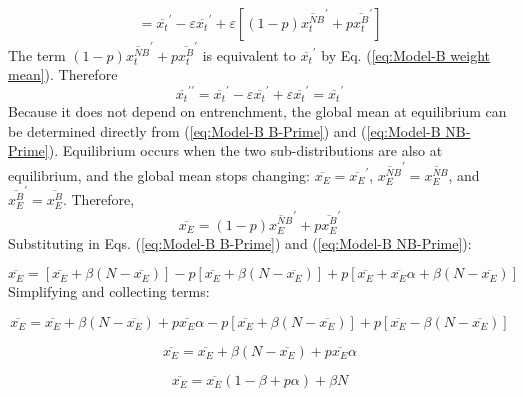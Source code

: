 \begin{equation}
=\overline{x_{t}}^{\prime}-\varepsilon\overline{x_{t}}^{\prime}+\varepsilon\left[(1-p)\overline{x_{t}^{NB}}^{\prime}+p\overline{x_{t}^{B}}^{\prime}\right]
\end{equation}
The term $(1-p)\overline{x_{t}^{NB}}^{\prime}+p\overline{x_{t}^{B}}^{\prime}$
is equivalent to $\overline{x_{t}}^{\prime}$ by Eq. (\ref{eq:Model-B weight mean}).
Therefore
\begin{equation}
\overline{x_{t}}^{\prime\prime}=\overline{x_{t}}^{\prime}-\varepsilon\overline{x_{t}}^{\prime}+\varepsilon\overline{x_{t}}^{\prime}=\overline{x_{t}}^{\prime}
\end{equation}
Because it does not depend on entrenchment, the global mean at equilibrium
can be determined directly from (\ref{eq:Model-B B-Prime}) and (\ref{eq:Model-B NB-Prime}).
Equilibrium occurs when the two sub-distributions are also at equilibrium,
and the global mean stops changing: $\overline{x_{E}}=\overline{x_{E}}^{\prime}$,
$\overline{x_{E}^{NB}}^{\prime}=\overline{x_{E}^{NB}}$, and $\overline{x_{E}^{B}}^{\prime}=\overline{x_{E}^{B}}$.
Therefore,
\begin{equation}
\overline{x_{E}}=(1-p)\overline{x_{E}^{NB}}^{\prime}+p\overline{x_{E}^{B}}^{\prime}
\end{equation}
Substituting in Eqs. (\ref{eq:Model-B B-Prime}) and (\ref{eq:Model-B NB-Prime}):

\begin{equation}
\overline{x_{E}}=[\overline{x_{E}}+\beta(N-\overline{x_{E}})]-p[\overline{x_{E}}+\beta(N-\overline{x_{E}})]+p[\overline{x_{E}}+\overline{x_{E}}\alpha+\beta(N-\overline{x_{E}})]
\end{equation}
Simplifying and collecting terms:

\begin{equation}
\overline{x_{E}}=\overline{x_{E}}+\beta(N-\overline{x_{E}})+p\overline{x_{E}}\alpha-p[\overline{x_{E}}+\beta(N-\overline{x_{E}})]+p[\overline{x_{E}}-\beta(N-\overline{x_{E}})]
\end{equation}

\begin{equation}
\overline{x_{E}}=\overline{x_{E}}+\beta(N-\overline{x_{E}})+p\overline{x_{E}}\alpha
\end{equation}

\begin{equation}
\overline{x_{E}}=\overline{x_{E}}(1-\beta+p\alpha)+\beta N
\end{equation}

